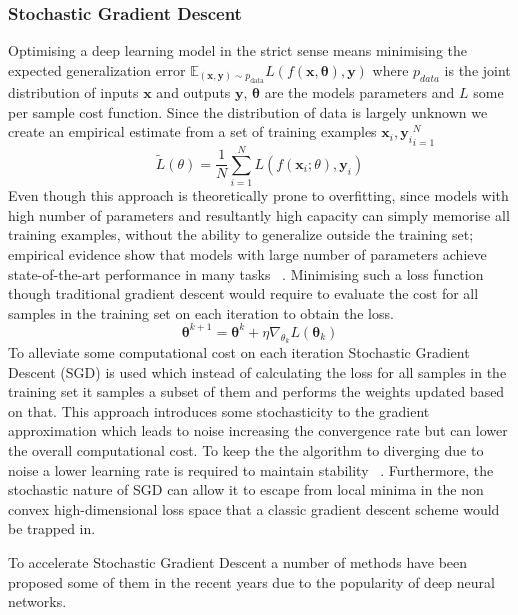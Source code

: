 \documentclass[11pt]{article}
\begin{document}
    \subsubsection{Stochastic Gradient Descent}
    Optimising a deep learning model in the strict sense means minimising the expected generalization error
    $\mathbb{E}_{(\pmb{x},\pmb{y}) \sim p_{\text{data}}} L(f(\pmb{x},\pmb\theta),\pmb{y})$ where $p_{data}$ is the joint
    distribution of inputs $\pmb{x}$ and outputs $\pmb{y}$, $\pmb\theta$ are the models parameters and $L$ some per
    sample cost function.
    Since the distribution of data is largely unknown we create an empirical estimate from a set of training examples
    ${\pmb{x}_i,\pmb{y}_i}_{i=1}^{N}$
    \begin{equation*}
        \tilde L(\theta ) = \frac{1}{N} \sum_{i=1}^N L( f(\pmb{x}_i; \theta), \pmb{y}_i )
    \end{equation*}
    Even though this approach is theoretically prone to overfitting, since models with high number of parameters and
    resultantly high capacity can simply memorise all training examples, without the ability to generalize outside
    the training set; empirical evidence show that models with large number of parameters achieve state-of-the-art
    performance in many tasks ~\cite{nakkiran2019deep}.
    Minimising such a loss function though traditional gradient descent would require to evaluate the cost for all
    samples in the training set on each iteration to obtain the loss.
    \begin{equation*}
        \pmb\theta^{k+1} = \pmb\theta^{k} + \eta \nabla_{\theta_k} L(\pmb\theta_k)
    \end{equation*}
    To alleviate some computational cost on each iteration Stochastic Gradient Descent (SGD) is used which instead of calculating
    the loss for all samples in the training set it samples a subset of them and performs the weights updated based
    on that.
    This approach introduces some stochasticity to the gradient approximation which leads to noise increasing the
    convergence rate but can lower the overall computational cost.
    To keep the the algorithm to diverging due to noise a lower learning rate is required to maintain stability
    ~\cite{kiwiel2001convergence}.
    Furthermore, the stochastic nature of SGD can allow it to escape from local minima in the non convex
    high-dimensional loss space that a classic gradient descent scheme would be trapped in.

    To accelerate Stochastic Gradient Descent a number of methods have been proposed some of them in the recent years due
    to the popularity of deep neural networks.
\end{document}
